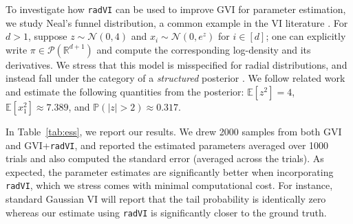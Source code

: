 \documentclass[twoside]{article}
\newcommand{\cN}{\mathcal{N}}
\newcommand{\cP}{\mathcal{P}}
\newcommand{\PP}{\mathbb{P}}
\newcommand{\1}{\mathds{1}}
\newcommand{\R}{\mathbb{R}}
\newcommand*{\E}{\mathbb E}
\theoremstyle{plain}
\theoremstyle{definition}
\theoremstyle{remark}
\begin{document}
{To investigate how \texttt{radVI} can be used to improve GVI for parameter estimation, we study Neal's funnel distribution, a common example in the VI literature \citep{neal2003slice,betancourt2015hamiltonian}. For $d > 1$, suppose $z \sim \cN(0,4)$ and $x_i \sim \cN(0,e^z)$ for $i \in [d]$; one can explicitly write $\pi \in \cP(\R^{d+1})$ and compute the corresponding log-density and its derivatives. We stress that this model is misspecified for radial distributions, and instead fall under the category of a \emph{structured} posterior \citep{sheng2025theory}.} We follow related work and estimate the following quantities from the posterior: $\E[z^2] = 4$, $\E[x_1^2] \approx 7.389$, and $\PP(|z| > 2) \approx 0.317$. 

In Table~\ref{tab:ess}, we report our results. We drew 2000 samples from both GVI and GVI+\texttt{radVI}, and reported the estimated parameters averaged over 1000 trials and also computed the standard error (averaged across the trials). As expected, the parameter estimates are significantly better when incorporating \texttt{radVI}, which we stress comes with minimal computational cost. For instance, standard Gaussian VI will report that the tail probability is identically zero whereas our estimate using \texttt{radVI} is significantly closer to the ground truth.

\begin{table}[t]
\centering
{}
\caption{In $d\in\{25,50\}$, we compare the performance of GVI and GVI+\texttt{radVI} for parameter estimation.}
\label{tab:ess}
\end{table}
\vspace{-4mm}
\end{document}
